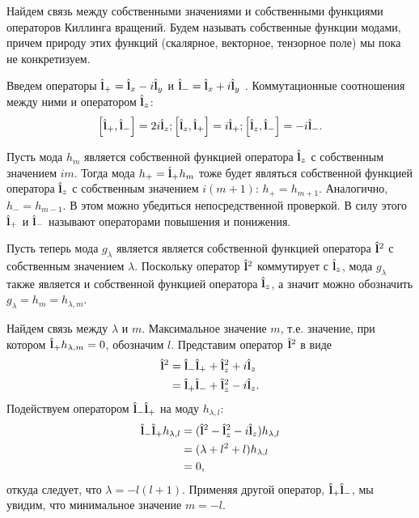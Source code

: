 \documentclass[12pt,a4paper]{article}
\begin{document}
        Найдем связь между собственными значениями и собственными функциями операторов Киллинга вращений. Будем называть собственные функции модами, причем природу этих функций (скалярное, векторное, тензорное поле) мы пока не конкретизуем.

        Введем операторы $\hat{\mathbf{l}}_{+} = \hat{\mathbf{l}}_x - i\hat{\mathbf{l}}_y$ и $\hat{\mathbf{l}}_{-} = \hat{\mathbf{l}}_x + i\hat{\mathbf{l}}_y$ \cite{burlankov_space_dynamics,burlankov_tmf}. Коммутационные соотношения между ними и оператором $\hat{\mathbf{l}}_z$:
        \begin{equation}
            \left[ \hat{\mathbf{l}}_{+}, \hat{\mathbf{l}}_{-} \right] = 2 i \hat{\mathbf{l}}_{z} ;
            \left[ \hat{\mathbf{l}}_{z}, \hat{\mathbf{l}}_{+} \right] =   i \hat{\mathbf{l}}_{+} ;
            \left[ \hat{\mathbf{l}}_{z}, \hat{\mathbf{l}}_{-} \right] = - i \hat{\mathbf{l}}_{-} .
        \end{equation}

        Пусть мода $h_m$ является собственной функцией оператора $\hat{\mathbf{l}}_z$ с собственным значением $i m$. Тогда мода $h_{+} = \hat{\mathbf{l}}_{+} h_m$ тоже будет являться собственной функцией оператора $\hat{\mathbf{l}}_z$ с собственным значением $i (m + 1)$: $h_{+} = h_{m + 1}$. Аналогично, $h_{-} = h_{m - 1}$. В этом можно убедиться непосредственной проверкой. В силу этого $\hat{\mathbf{l}}_{+}$ и $\hat{\mathbf{l}}_{-}$ называют операторами повышения и понижения.

        Пусть теперь мода $g_\lambda$ является является собственной функцией оператора $\hat{\mathbf{l}}^2$ с собственным значением $\lambda$. Поскольку оператор $\hat{\mathbf{l}}^2$ коммутирует с $\hat{\mathbf{l}}_z$, мода $g_\lambda$ также является и собственной функцией оператора $\hat{\mathbf{l}}_z$, а значит можно обозначить $g_\lambda = h_m = h_{\lambda,m}$.

        Найдем связь между $\lambda$ и $m$. Максимальное значение $m$, т.е. значение, при котором $\hat{\mathbf{l}}_{+} h_{\lambda,m} = 0$, обозначим $l$. Представим оператор $\hat{\mathbf{l}}^2$ в виде
        \begin{equation}\begin{aligned}
            \hat{\mathbf{l}}^2
                &= \hat{\mathbf{l}}_{-}\hat{\mathbf{l}}_{+} + \hat{\mathbf{l}}^2_{z} + i \hat{\mathbf{l}}_{z} \\
                &= \hat{\mathbf{l}}_{+}\hat{\mathbf{l}}_{-} + \hat{\mathbf{l}}^2_{z} - i \hat{\mathbf{l}}_{z} .
        \end{aligned}\end{equation}
        Подействуем оператором $\hat{\mathbf{l}}_{-}\hat{\mathbf{l}}_{+}$ на моду $h_{\lambda,l}$:
        \begin{equation}\begin{aligned}
            \hat{\mathbf{l}}_{-}\hat{\mathbf{l}}_{+} h_{\lambda,l}
                &= (\hat{\mathbf{l}}^2 - \hat{\mathbf{l}}^2_{z} - i \hat{\mathbf{l}}_{z}) h_{\lambda,l} \\
                &= (\lambda + l^2 + l) h_{\lambda,l} \\
                &= 0 ,
        \end{aligned}\end{equation}
        откуда следует, что $\lambda = - l (l + 1)$. Применяя другой оператор, $\hat{\mathbf{l}}_{+}\hat{\mathbf{l}}_{-}$, мы увидим, что минимальное значение $m = - l$.
\end{document}
